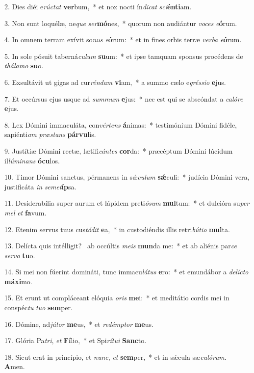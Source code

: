 2. Dies diéi e\textit{rúc}\textit{tat} \textbf{ver}bum,~*  et nox nocti ín\textit{di}\textit{cat} \textit{sci}\textbf{én}\textbf{ti}am.\

3. Non sunt loquélæ, ne\textit{que} \textit{ser}\textbf{mó}nes,~*  quorum non audiántur \textit{vo}\textit{ces} \textit{e}\textbf{ó}rum.\

4. In omnem terram exívit so\textit{nus} \textit{e}\textbf{ó}rum:~*  et in fines orbis terræ \textit{ver}\textit{ba} \textit{e}\textbf{ó}rum.\

5. In sole pósuit taberná\textit{cu}\textit{lum} \textbf{su}um:~*  et ipse tamquam sponsus procédens de \textit{thá}\textit{la}\textit{mo} \textbf{su}o.\

6. Exsultávit ut gigas ad cur\textit{rén}\textit{dam} \textbf{vi}am,~*  a summo cælo e\textit{grés}\textit{si}\textit{o} \textbf{e}jus.\

7. Et occúrsus ejus usque ad \textit{sum}\textit{mum} \textbf{e}jus:~*  nec est qui se abscóndat a \textit{ca}\textit{ló}\textit{re} \textbf{e}jus.\

8. Lex Dómini immaculáta, con\textit{vér}\textit{tens} \textbf{á}nimas:~*  testimónium Dómini fidéle, sapiénti\textit{am} \textit{præ}\textit{stans} \textbf{pár}\textbf{vu}lis.\

9. Justítiæ Dómini rectæ, lætifi\textit{cán}\textit{tes} \textbf{cor}da:~*  præcéptum Dómini lúcidum il\textit{lú}\textit{mi}\textit{nans} \textbf{ó}\textbf{cu}los.\

10. Timor Dómini sanctus, pérmanens in sǽ\textit{cu}\textit{lum} \textbf{sǽ}culi:~*  judícia Dómini vera, justificáta \textit{in} \textit{se}\textit{met}\textbf{íp}sa.\

11. Desiderabília super aurum et lápidem preti\textit{ó}\textit{sum} \textbf{mul}tum:~*  et dulcióra su\textit{per} \textit{mel} \textit{et} \textbf{fa}vum.\

12. Etenim servus tuus cus\textit{tó}\textit{dit} \textbf{e}a,~*  in custodiéndis illis retri\textit{bú}\textit{ti}\textit{o} \textbf{mul}ta.\

13. Delícta quis intélligit? \dag\  ab occúltis \textit{me}\textit{is} \textbf{mun}da me:~*  et ab aliénis par\textit{ce} \textit{ser}\textit{vo} \textbf{tu}o.\

14. Si mei non fúerint domináti, tunc immacu\textit{lá}\textit{tus} \textbf{e}ro:~*  et emundábor a \textit{de}\textit{líc}\textit{to} \textbf{má}\textbf{xi}mo.\

15. Et erunt ut compláceant elóquia \textit{o}\textit{ris} \textbf{me}i:~*  et meditátio cordis mei in conspéc\textit{tu} \textit{tu}\textit{o} \textbf{sem}per.\

16. Dómine, ad\textit{jú}\textit{tor} \textbf{me}us,~*  et \textit{red}\textit{émp}\textit{tor} \textbf{me}us.\

17. Glória Pa\textit{tri}, \textit{et} \textbf{Fí}lio,~*  et Spi\textit{rí}\textit{tu}\textit{i} \textbf{Sanc}to.\

18. Sicut erat in princípio, et \textit{nunc}, \textit{et} \textbf{sem}per,~*  et in sǽcula sæ\textit{cu}\textit{ló}\textit{rum}. \textbf{A}men.\

